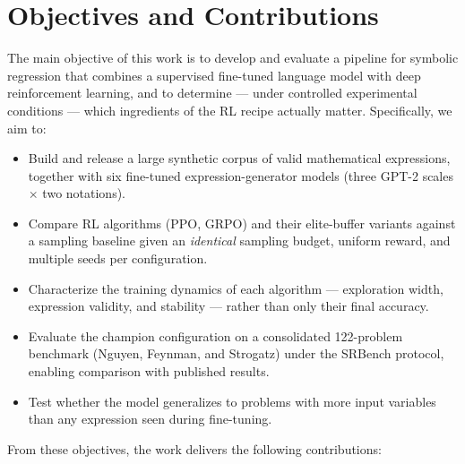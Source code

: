 \section{Objectives and Contributions}

The main objective of this work is to develop and evaluate a pipeline for symbolic regression that combines a supervised fine-tuned language model with deep reinforcement learning, and to determine --- under controlled experimental conditions --- which ingredients of the RL recipe actually matter. Specifically, we aim to:

\begin{itemize}
    \item Build and release a large synthetic corpus of valid mathematical expressions, together with six fine-tuned expression-generator models (three GPT-2 scales $\times$ two notations).
    \item Compare RL algorithms (PPO, GRPO) and their elite-buffer variants against a sampling baseline given an \emph{identical} sampling budget, uniform reward, and multiple seeds per configuration.
    \item Characterize the training dynamics of each algorithm --- exploration width, expression validity, and stability --- rather than only their final accuracy.
    \item Evaluate the champion configuration on a consolidated 122-problem benchmark (Nguyen, Feynman, and Strogatz) under the SRBench protocol, enabling comparison with published results.
    \item Test whether the model generalizes to problems with more input variables than any expression seen during fine-tuning.
\end{itemize}

From these objectives, the work delivers the following contributions:

